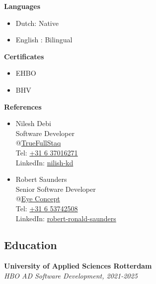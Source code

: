 \documentclass[11pt, twoside, a4paper, titlepage]{article}
\begin{document}
\begin{tcolorbox}[boxsep=0mm, left=0mm, right=0mm, top=0mm, bottom=0mm, height=23cm]
\begin{minipage}[t]{6.01cm}
\begin{tcolorbox}[colframe=black, colback=black, arc=0mm, sharp corners, fontupper=\color{white}, height=22.9cm]
			\textbf{Languages}\\
			\begin{itemize}
				\item Dutch: Native
				\item English : Bilingual
			\end{itemize}
			
			\vspace*{0.4cm}

			\textbf{Certificates}\\
			\begin{itemize}
				\item EHBO
				\item BHV
			\end{itemize}
			
			\vspace*{0.4cm}


			\textbf{References}\\
			\begin{itemize}
				\item{ Nilesh Debi\\
					Software Developer\\
					@\href{https://www.truefullstaq.com/}{TrueFullStaq}\\
					Tel: \href{tel:+31637016271}{+31 6 37016271}\\
					LinkedIn: \href{https://www.linkedin.com/in/nilesh-kd}{nilish-kd}}
				\item{ Robert Saunders\\
					Senior Software Developer\\
					@\href{https://www.eyeconcept.nl/}{Eye Concept}\\
					Tel: \href{tel:+31653742508}{+31 6 53742508}\\
					LinkedIn: \href{https://www.linkedin.com/in/robert-ronald-saunders}{robert-ronald-saunders}}
			\end{itemize}
		\end{tcolorbox}
	\end{minipage}
	\vspace*{-0.3cm}
	\begin{minipage}[t]{14cm}
		\begin{tcolorbox}[grow to left by=0.0cm, colframe=white, colback=white, height=22.9cm]
			\section*{Education}
			\textbf{University of Applied Sciences Rotterdam}\\
			\emph{HBO AD Software Development, 2021-2025}
			

\end{tcolorbox}
\end{minipage}
\end{tcolorbox}
\end{document}
